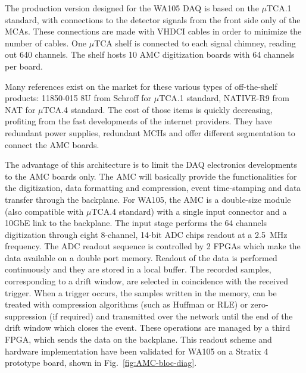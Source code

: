 The production version designed for the WA105 DAQ is based on the $\mu$TCA.1 standard, with connections to the detector signals from the
front side only of the MCAs. These connections are made with VHDCI cables in order to minimize the number of cables. One $\mu$TCA shelf
is connected to each signal chimney, reading out 640 channels.  The shelf hosts 10 AMC digitization boards with 64 channels per board.


Many references exist on the market for these various types of off-the-shelf products: 11850-015 8U from Schroff for $\mu$TCA.1 standard, NATIVE-R9 from NAT for $\mu$TCA.4 standard. The cost of those items is quickly decreasing, profiting from the fast developments of the internet
providers. They have redundant power supplies, redundant MCHs and offer different segmentation to connect the AMC boards.



The advantage of this architecture is to limit the DAQ electronics developments to the AMC boards only. The AMC will basically provide
the functionalities for the digitization, data formatting and compression, event time-stamping and data transfer through the
backplane. For WA105, the AMC is a double-size module (also compatible with $\mu$TCA.4 standard) with a single input connector and a 10GbE
link to the backplane. The input stage performs the 64 channels digitization through eight 8-channel, 14-bit ADC chips readout at a
2.5~MHz frequency. The ADC readout sequence is controlled by 2 FPGAs which make the data available on a double port memory. Readout of the
data is performed continuously and they are stored in a local buffer. The recorded samples, corresponding to a drift window, are
selected in coincidence with the received trigger. When a trigger occurs, the samples written in the memory, can be treated with
compression algorithms (such as Huffman or RLE) or zero-suppression (if required) and transmitted over the network until the end of the
drift window which closes the event. These operations are managed by a third FPGA, which sends the data on the backplane.  This readout
scheme and hardware implementation have been validated for WA105 on a Stratix 4 prototype board, shown in Fig.~\ref{fig:AMC-bloc-diag}.

